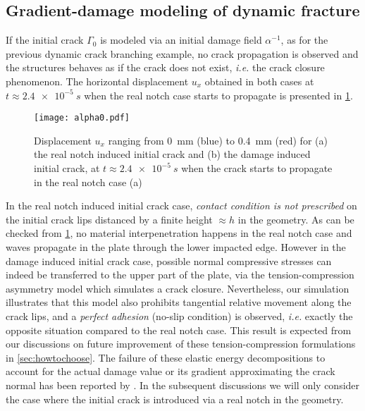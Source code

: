 \subsection{Gradient-damage modeling of dynamic fracture}
If the initial crack $\Gamma_0$ is modeled via an initial damage field $\alpha^{-1}$, as for the previous dynamic crack branching example, no crack propagation is observed and the structures behaves as if the crack does not exist, \emph{i.e.} the crack closure phenomenon. The horizontal displacement $u_x$ obtained in both cases at $t\approx\SI{2.4e-5}{s}$ when the real notch case starts to propagate is presented in \cref{fig:alpha0}.
\begin{figure}[htbp]
\centering
\texttt{[image: alpha0.pdf]}
\caption{Displacement $u_x$ ranging from \SI{0}{mm} (blue) to \SI{0.4}{mm} (red) for (a) the real notch induced initial crack and (b) the damage induced initial crack, at $t\approx\SI{2.4e-5}{s}$ when the crack starts to propagate in the real notch case (a)} \label{fig:alpha0}
\end{figure}
In the real notch induced initial crack case, \emph{contact condition is not prescribed} on the initial crack lips distanced by a finite height $\approx h$ in the geometry. As can be checked from \cref{fig:alpha0}, no material interpenetration happens in the real notch case and waves propagate in the plate through the lower impacted edge. However in the damage induced initial crack case, possible normal compressive stresses can indeed be transferred to the upper part of the plate, via the tension-compression asymmetry model \cite{FreddiRoyer-Carfagni:2010} which simulates a crack closure. Nevertheless, our simulation illustrates that this model also prohibits tangential relative movement along the crack lips, and a \emph{perfect adhesion} (no-slip condition) is observed, \emph{i.e.} exactly the opposite situation compared to the real notch case. This result is expected from our discussions on future improvement of these tension-compression formulations in \cref{sec:howtochoose}. The failure of these elastic energy decompositions to account for the actual damage value or its gradient approximating the crack normal has been reported by \cite{MayVignolletBorst:2015,Strobl:2015aa}. In the subsequent discussions we will only consider the case where the initial crack is introduced via a real notch in the geometry.


